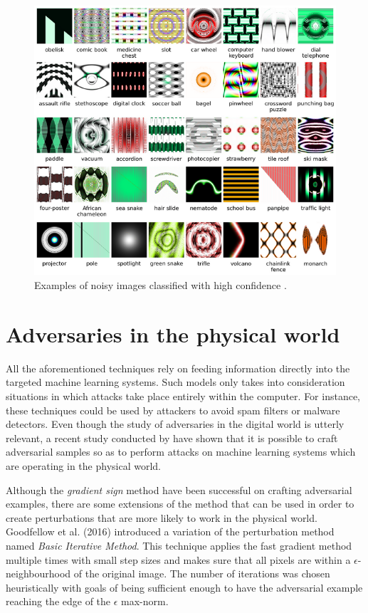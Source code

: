 \begin{figure}[!h]
	\centering
	\includegraphics[scale=1.]{unrec_images.png}
	\caption{Examples of noisy images classified with high confidence \cite{nguyen2015}.}
	\label{fig:unrec_images}
\end{figure}


\section{Adversaries in the physical world}\label{sec:physical}

All the aforementioned techniques rely on feeding information directly into the targeted machine learning systems. Such models only takes into consideration situations in which attacks take place entirely within the computer. For instance, these techniques could be used by attackers to avoid spam filters or malware detectors. Even though the study of adversaries in the digital world is utterly relevant, a recent study conducted by \cite{goodfellow2016} have shown that it is possible to craft adversarial samples so as to perform attacks on machine learning systems which are operating in the physical world.

Although the \textit{gradient sign} method have been successful on crafting adversarial examples, there are some extensions of the method that can be used in order to create perturbations that are more likely to work in the physical world. Goodfellow et al. (2016) introduced a variation of the perturbation method named \textit{Basic Iterative Method}. This technique applies the fast gradient method multiple times with small step sizes and makes sure that all pixels are within a $\epsilon$-neighbourhood of the original image. The number of iterations was chosen heuristically with goals of being sufficient enough to have the adversarial example reaching the edge of the $\epsilon$ max-norm.

